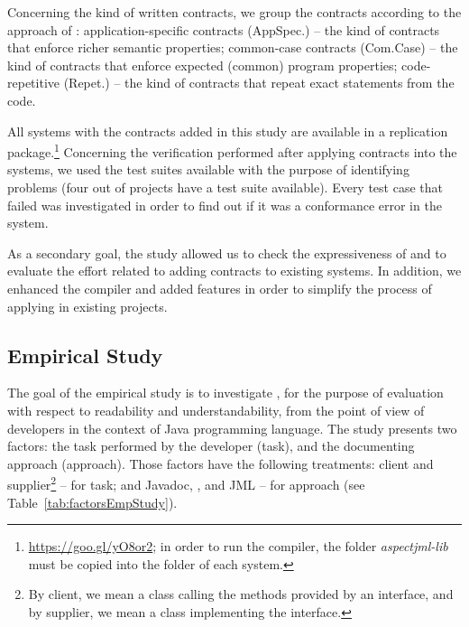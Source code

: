 Concerning the kind of written contracts, we group the contracts according to
the approach of \cite{typeContracts}: application-specific contracts
(AppSpec.) -- the kind of contracts that enforce richer semantic properties;
 common-case contracts (Com.Case) -- the kind of contracts that enforce
expected (common) program properties;
code-repetitive (Repet.) -- the kind of
contracts that repeat exact statements from the code.

All systems with the contracts added in this study are available in a replication
package.\footnote{\url{https://goo.gl/yO8or2}; in order to run the
\contractjdoc{} compiler, the folder \textit{aspectjml-lib} must be copied into the folder of each system.}
Concerning the verification performed after applying \contractjdoc{} contracts into the systems,
we used the test suites available with the purpose of identifying problems
(four out of \totalSystems{} projects have a test suite available).
Every test case that failed was investigated in order to find out if it was a conformance error in the system.

As a secondary goal, the study allowed us to check the expressiveness of \contractjdoc{} and to
evaluate the effort related to adding contracts to existing systems.
In addition, we enhanced the compiler and added features in order to simplify
the process of applying \contractjdoc{} in existing projects.

\subsection{Empirical Study}
\label{sec:experiment}

The goal of the empirical study is to investigate
\contractjdoc{}, for the purpose of evaluation with respect to readability and understandability, from the point of view of
developers in the context of Java programming language. The study presents two factors: the task performed by the
developer (task), and the documenting approach (approach).
Those factors have the following treatments: client and supplier\footnote{By client, we mean a class calling the methods provided by an interface, and by supplier, we mean a class implementing the
interface.} -- for task; and Javadoc,
\contractjdoc{}, and JML -- for approach (see Table~\ref{tab:factorsEmpStudy}).

